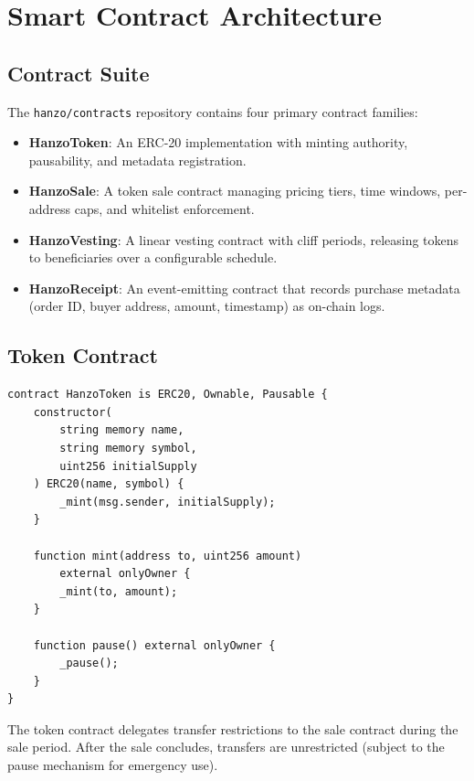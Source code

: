 \documentclass[11pt,a4paper]{article}
\begin{document}
\section{Smart Contract Architecture}

\subsection{Contract Suite}

The \texttt{hanzo/contracts} repository contains four primary contract families:

\begin{itemize}
    \item \textbf{HanzoToken}: An ERC-20 implementation with minting authority, pausability, and metadata registration.
    \item \textbf{HanzoSale}: A token sale contract managing pricing tiers, time windows, per-address caps, and whitelist enforcement.
    \item \textbf{HanzoVesting}: A linear vesting contract with cliff periods, releasing tokens to beneficiaries over a configurable schedule.
    \item \textbf{HanzoReceipt}: An event-emitting contract that records purchase metadata (order ID, buyer address, amount, timestamp) as on-chain logs.
\end{itemize}

\subsection{Token Contract}

\begin{lstlisting}[language=Solidity,caption=HanzoToken core interface.]
contract HanzoToken is ERC20, Ownable, Pausable {
    constructor(
        string memory name,
        string memory symbol,
        uint256 initialSupply
    ) ERC20(name, symbol) {
        _mint(msg.sender, initialSupply);
    }

    function mint(address to, uint256 amount)
        external onlyOwner {
        _mint(to, amount);
    }

    function pause() external onlyOwner {
        _pause();
    }
}
\end{lstlisting}

The token contract delegates transfer restrictions to the sale contract during the sale period. After the sale concludes, transfers are unrestricted (subject to the pause mechanism for emergency use).
\end{document}
